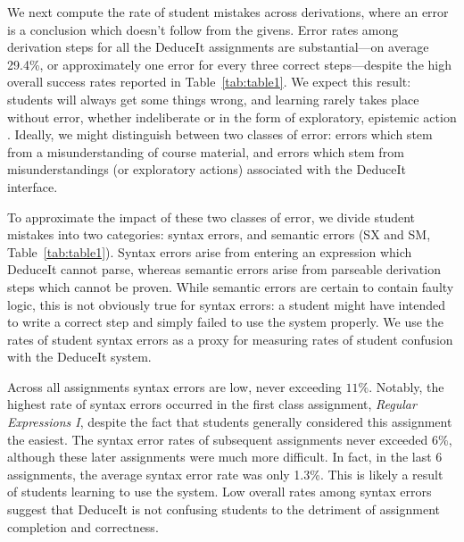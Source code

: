 \documentclass{sigchi}
\newcommand{\msb}[1]{\textbf{\textcolor{cyan}{Michael: #1}}}
\begin{document}
We next compute the rate of student mistakes across derivations, where an error is a conclusion which doesn't follow from the givens. Error rates among derivation steps for all the DeduceIt assignments are substantial---on average 29.4\%, or approximately one error for every three correct steps---despite the high overall success rates reported in Table~\ref{tab:table1}. We expect this result: students will always get some things wrong, and learning rarely takes place without error, whether indeliberate or in the form of exploratory, epistemic action \cite{citeulike}. Ideally, we might distinguish between two classes of error: errors which stem from a misunderstanding of course material, and errors which stem from misunderstandings (or exploratory actions) associated with the DeduceIt interface. %

To approximate the impact of these two classes of error, we divide student mistakes into two categories: syntax errors, and semantic errors (SX and SM, Table~\ref{tab:table1}). Syntax errors arise from entering an expression which DeduceIt cannot parse, whereas semantic errors arise from parseable derivation steps which cannot be proven. While semantic errors are certain to contain faulty logic, this is not obviously true for syntax errors: a student might have intended to write a correct step and simply failed to use the system properly. We use the rates of student syntax errors as a proxy for measuring rates of student confusion with the DeduceIt system.

Across all assignments syntax errors are low, never exceeding $11\%$. Notably, the highest rate of syntax errors occurred in the first class assignment, \textit{Regular Expressions I}, despite the fact that students generally considered this assignment the easiest. The syntax error rates of subsequent assignments never exceeded $6\%$, although these later assignments were much more difficult. In fact, in the last 6 assignments, the average syntax error rate was only 1.3\%. This is likely a result of students learning to use the system. Low overall rates among syntax errors suggest that DeduceIt is not confusing students to the detriment of assignment completion and correctness.
\end{document}
